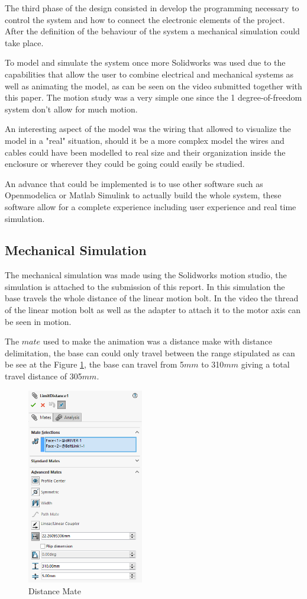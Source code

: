 \documentclass[transmag]{IEEEtran}
\begin{document}
The third phase of the design consisted in develop the programming necessary to control the system and how to connect the electronic elements of the project. After the definition of the behaviour of the system a mechanical simulation could take place.

To model and simulate the system once more Solidworks was used due to the capabilities that allow the user to combine electrical and mechanical systems as well as animating the model, as can be seen on the video submitted together with this paper. The motion study was a very simple one since the 1 degree-of-freedom system don't allow for much motion.

An interesting aspect of the model was the wiring that allowed to visualize the model in a "real" situation, should it be a more complex model the wires and cables could have been modelled to real size and their organization inside the enclosure or wherever they could be going could easily be studied. 

An advance that could be implemented is to use other software such as Openmodelica or Matlab Simulink to actually build the whole system, these software allow for a complete experience including user experience and real time simulation.

\subsection{Mechanical Simulation}

The mechanical simulation was made using the Solidworks motion studio, the simulation is attached to the submission of this report. In this simulation the base travels the whole distance of the linear motion bolt. In the video the thread of the linear motion bolt as well as the adapter to attach it to the motor axis can be seen in motion.

The $mate$ used to make the animation was a distance make with distance delimitation, the base can could only travel between the range stipulated as can be see at the Figure \ref{ASS4-DistanceMate}, the base can travel from 5$mm$ to 310$mm$ giving a total travel distance of 305$mm$.

\begin{figure}[H]
\centerline{\includegraphics[width=2in]{./images/ASS4-DistanceMate}}
\caption{Distance Mate\label{ASS4-DistanceMate}}
\end{figure}
\end{document}
